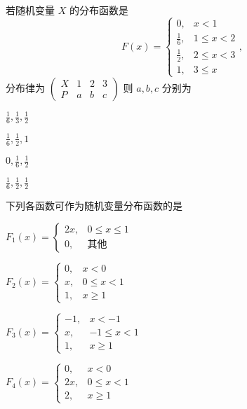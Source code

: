 \documentclass{exam-zh}
\begin{document}
\begin{question}
  若随机变量 $X$ 的分布函数是  
  $$F(x) = 
  \begin{cases} 
  0, & x < 1 \\ 
  \frac{1}{6}, & 1 \leq x < 2 \\ 
  \frac{1}{2}, & 2 \leq x < 3 \\ 
  1, & 3 \leq x 
  \end{cases},$$  
  分布律为  
  $
  \begin{pmatrix}
  X & 1 & 2 & 3 \\
  P & a & b & c
  \end{pmatrix}$  
  则 $a, b, c$ 分别为 \paren[A]
  \begin{choices}
    \item $\frac{1}{6}, \frac{1}{3}, \frac{1}{2}$  
    \item $\frac{1}{6}, \frac{1}{2}, 1$  
    \item $0, \frac{1}{6}, \frac{1}{2}$  
    \item $\frac{1}{6}, \frac{1}{2}, \frac{1}{2}$  
  \end{choices}
\end{question}

\begin{question}
  下列各函数可作为随机变量分布函数的是 \paren[B]
  \begin{choices}
    \item 
    $F_1(x) = 
    \begin{cases} 
    2x, & 0 \leq x \leq 1 \\
    0, & \text{其他}
    \end{cases}$
    
    \item 
    $F_2(x) =
    \begin{cases} 
    0, & x < 0 \\
    x, & 0 \leq x < 1 \\
    1, & x \geq 1
    \end{cases}$
    
    \item 
    $F_3(x) =
    \begin{cases} 
    -1, & x < -1 \\
    x, & -1 \leq x < 1 \\
    1, & x \geq 1
    \end{cases}$
    
    \item 
    $F_4(x) =
    \begin{cases} 
    0, & x < 0 \\
    2x, & 0 \leq x < 1 \\
    2, & x \geq 1
    \end{cases}$
  \end{choices}
\end{question}
\end{document}
